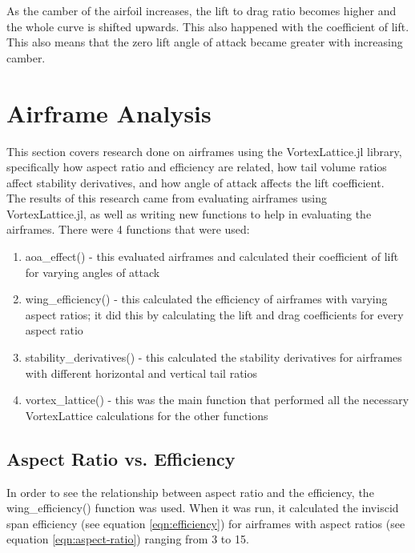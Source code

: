 \documentclass{journal}
\begin{document}
	As the camber of the airfoil increases, the lift to drag ratio becomes higher and the whole curve is shifted upwards. This also happened with the coefficient of lift. This also means that the zero lift angle of attack became greater with increasing camber.\\
	
	\section{Airframe Analysis}
	
	This section covers research done on airframes using the VortexLattice.jl library, specifically how aspect ratio and efficiency are related, how tail volume ratios affect stability derivatives, and how angle of attack affects the lift coefficient.\\
	
	The results of this research came from evaluating airframes using VortexLattice.jl, as well as writing new functions to help in evaluating the airframes. There were 4 functions that were  used:
	
	\begin{enumerate}
		\item aoa\_effect() - this evaluated airframes and calculated their coefficient of lift for varying angles of attack 
		\item wing\_efficiency() - this calculated the efficiency of airframes with varying aspect ratios; it did this by calculating the lift and drag coefficients for every aspect ratio
		\item stability\_derivatives() - this calculated the stability derivatives for airframes with different horizontal and vertical tail ratios
		\item vortex\_lattice() - this was the main function that performed all the necessary VortexLattice calculations for the other functions 
	\end{enumerate}

	\subsection{Aspect Ratio vs. Efficiency}
	
	In order to see the relationship between aspect ratio and the efficiency, the wing\_efficiency() function was used. When it was run, it calculated the inviscid span efficiency (see equation \ref{eqn:efficiency}) for airframes with aspect ratios (see equation \ref{eqn:aspect-ratio}) ranging from 3 to 15.\\
	
\end{document}
